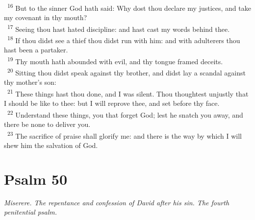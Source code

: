 \documentclass[a5paper,12pt]{article}
\begin{document}
\begin{multicols*}{2}
~\textsuperscript{16} But to the sinner God hath said: Why dost thou declare my justices, and take my covenant in thy mouth?\\
~\textsuperscript{17} Seeing thou hast hated discipline: and hast cast my words behind thee.\\
~\textsuperscript{18} If thou didst see a thief thou didst run with him: and with adulterers thou hast been a partaker.\\
~\textsuperscript{19} Thy mouth hath abounded with evil, and thy tongue framed deceits.\\
~\textsuperscript{20} Sitting thou didst speak against thy brother, and didst lay a scandal against thy mother's son:\\
~\textsuperscript{21} These things hast thou done, and I was silent. Thou thoughtest unjustly that I should be like to thee: but I will reprove thee, and set before thy face.\\
~\textsuperscript{22} Understand these things, you that forget God; lest he snatch you away, and there be none to deliver you.\\
~\textsuperscript{23} The sacrifice of praise shall glorify me: and there is the way by which I will shew him the salvation of God.\\

\section{Psalm 50}
\label{sec:org7b04dde}
\emph{Miserere. The repentance and confession of David after his sin. The fourth penitential psalm.}\\


\end{multicols*}
\end{document}
